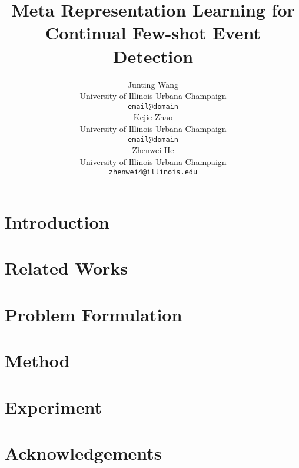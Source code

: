 \documentclass[11pt]{article}
\title{Meta Representation Learning for Continual Few-shot Event Detection}
\author{Junting Wang \\
  University of Illinois Urbana-Champaign \\
  \texttt{email@domain} \\\And
  Kejie Zhao \\
  University of Illinois Urbana-Champaign \\
  \texttt{email@domain} \\\And
  Zhenwei He \\
  University of Illinois Urbana-Champaign \\
  \texttt{zhenwei4@illinois.edu} \\}
\begin{document}
\maketitle\begin{abstract}

\end{abstract}


\section{Introduction}
\label{sec:introduction}


\section{Related Works}
\label{sec:related_work}


\section{Problem Formulation}
\label{sec:formulation}


\section{Method}
\label{sec:method}



\section{Experiment }
\label{sec:experiment}





%
%
%



\section{Acknowledgements}


\nocite{Ando2005,borschinger-johnson-2011-particle,andrew2007scalable,rasooli-tetrault-2015,goodman-etal-2016-noise,harper-2014-learning}


\appendix
\end{document}
